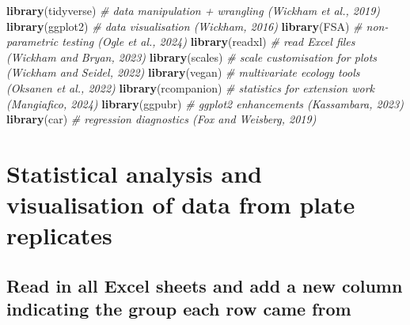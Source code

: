 \documentclass[
]{article}
\newenvironment{Shaded}{\begin{snugshade}}{\end{snugshade}}
\newcommand{\AttributeTok}[1]{\textcolor[rgb]{0.13,0.29,0.53}{#1}}
\newcommand{\CommentTok}[1]{\textcolor[rgb]{0.56,0.35,0.01}{\textit{#1}}}
\newcommand{\ControlFlowTok}[1]{\textcolor[rgb]{0.13,0.29,0.53}{\textbf{#1}}}
\newcommand{\FunctionTok}[1]{\textcolor[rgb]{0.13,0.29,0.53}{\textbf{#1}}}
\newcommand{\NormalTok}[1]{#1}
\newcommand{\OtherTok}[1]{\textcolor[rgb]{0.56,0.35,0.01}{#1}}
\newcommand{\SpecialCharTok}[1]{\textcolor[rgb]{0.81,0.36,0.00}{\textbf{#1}}}
\newcommand{\StringTok}[1]{\textcolor[rgb]{0.31,0.60,0.02}{#1}}
\begin{document}
\begin{Shaded}
\begin{Highlighting}[]
\FunctionTok{library}\NormalTok{(tidyverse)      }\CommentTok{\# data manipulation + wrangling (Wickham et al., 2019)}
\FunctionTok{library}\NormalTok{(ggplot2)        }\CommentTok{\# data visualisation (Wickham, 2016)}
\FunctionTok{library}\NormalTok{(FSA)            }\CommentTok{\# non{-}parametric testing (Ogle et al., 2024)}
\FunctionTok{library}\NormalTok{(readxl)         }\CommentTok{\# read Excel files (Wickham and Bryan, 2023)}
\FunctionTok{library}\NormalTok{(scales)         }\CommentTok{\# scale customisation for plots (Wickham and Seidel, 2022)}
\FunctionTok{library}\NormalTok{(vegan)          }\CommentTok{\# multivariate ecology tools (Oksanen et al., 2022)}
\FunctionTok{library}\NormalTok{(rcompanion)     }\CommentTok{\# statistics for extension work (Mangiafico, 2024)}
\FunctionTok{library}\NormalTok{(ggpubr)         }\CommentTok{\# ggplot2 enhancements (Kassambara, 2023)}
\FunctionTok{library}\NormalTok{(car)            }\CommentTok{\# regression diagnostics (Fox and Weisberg, 2019)}
\end{Highlighting}
\end{Shaded}

\section{Statistical analysis and visualisation of data from plate
replicates}\label{statistical-analysis-and-visualisation-of-data-from-plate-replicates}

\subsection{Read in all Excel sheets and add a new column indicating the
group each row came
from}\label{read-in-all-excel-sheets-and-add-a-new-column-indicating-the-group-each-row-came-from}

\begin{Shaded}
\end{Shaded}
\end{document}
